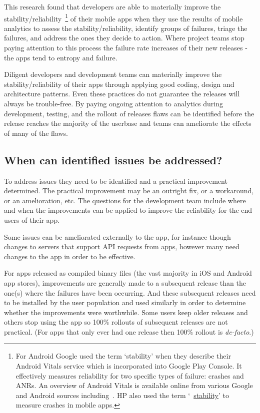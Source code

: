 This research found that developers are able to materially improve the stability/reliability~\footnote{For Android Google used the term `stability' when they describe their Android Vitals service which is incorporated into Google Play Console. It effectively measures reliability for two specific types of failure: crashes and ANRs. An overview of Android Vitals is available online from various Google and Android sources including~\citep{android_vitals_overview_2019, android_vitals_best_practices}. HP also used the term `~\href{glossary-stability}{stability}' to measure crashes in mobile apps.}
%
of their mobile apps when they use the results of mobile analytics to assess the stability/reliability, identify groups of failures, triage the failures, and address the ones they decide to action. Where project teams stop paying attention to this process the failure rate increases of their new releases - the apps tend to entropy and failure.

Diligent developers and development teams can materially improve the stability/reliability of their apps through applying good coding, design and architecture patterns. Even these practices do not guarantee the releases will always be trouble-free. By paying ongoing attention to analytics during development, testing, and the rollout of releases flaws can be identified before the release reaches the majority of the userbase and teams can ameliorate the effects of many of the flaws.
\clearpage 


\subsection{When can identified issues be addressed?}
To address issues they need to be identified and a practical improvement determined. The practical improvement may be an outright fix, or a workaround, or an amelioration, etc. The questions for the development team include where and when the improvements can be applied to improve the reliability for the end users of their app.

Some issues can be ameliorated externally to the app, for instance though changes to servers that support API requests from apps, however many need changes to the app in order to be effective.

For apps released as compiled binary files (the vast majority in iOS and Android app stores), improvements are generally made to a subsequent release than the one(s) where the failures have been occurring\footnotemark. And these subsequent releases need to be installed by the user population and used similarly in order to determine whether the improvements were worthwhile. Some users keep older releases and others stop using the app so 100\% rollouts of subsequent releases are not practical. (For apps that only ever had one release then 100\% rollout is \emph{de-facto}.)

